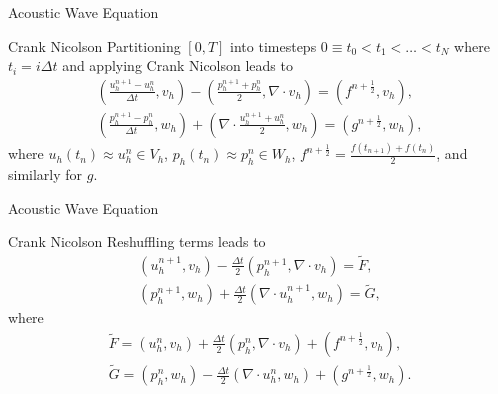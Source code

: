 \documentclass[presentation]{beamer}
\begin{document}
\begin{frame}{Acoustic Wave Equation}
	\begin{block}{Crank Nicolson}
		Partitioning $[0,T]$ into timesteps $0 \equiv t_0 < t_1 < \dots < t_N$ where $t_i = i\Delta t$ and applying Crank Nicolson leads to
		\begin{gather*}
			\left(\frac{u^{n+1}_h-u^n_h}{\Delta t},v_h\right)-\left(\frac{p^{n+1}_h+p^n_h}{2},\nabla \cdot v_h\right) = \left(f^{n+\frac{1}{2}},v_h\right), \\
			\left(\frac{p^{n+1}_h-p^n_h}{\Delta t},w_h\right)+\left(\nabla \cdot \frac{u^{n+1}_h+u^n_h}{2},w_h\right) = \left(g^{n+\frac{1}{2}},w_h\right),
		\end{gather*}
		where $u_h(t_n) \approx u^n_h \in V_h$, $p_h(t_n) \approx p^n_h \in W_h$, $f^{n+\frac{1}{2}} = \frac{f(t_{n+1})+f(t_n)}{2}$, and similarly for $g$.
	\end{block}
\end{frame}

\begin{frame}{Acoustic Wave Equation}
	\begin{block}{Crank Nicolson}
		Reshuffling terms leads to
		\begin{gather*}
			\left(u^{n+1}_h,v_h\right) - \frac{\Delta t}{2}\left(p^{n+1}_h, \nabla \cdot v_h\right) = \tilde{F}, \\
			\left(p^{n+1}_h,w_h\right) + \frac{\Delta t}{2}\left(\nabla \cdot u^{n+1}_h,w_h\right) = \tilde{G},
		\end{gather*}
		where
		\begin{gather*}
		\tilde{F} = \left(u^n_h, v_h\right) +\frac{\Delta t}{2}\left(p^n_h,\nabla \cdot v_h\right)+\left(f^{n+\frac{1}{2}},v_h\right),\\
		\tilde{G} = \left(p^n_h,w_h\right) - \frac{\Delta t}{2}\left(\nabla \cdot u^n_h,w_h\right)+\left(g^{n+\frac{1}{2}},w_h\right).
		\end{gather*}
	\end{block}
\end{frame}
\end{document}
